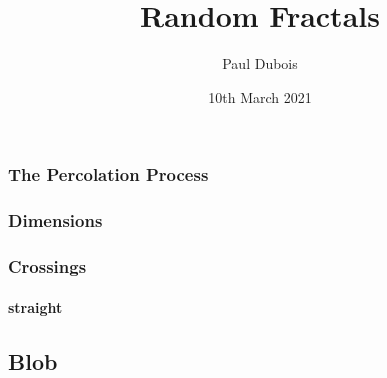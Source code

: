\documentclass{beamer}
\begin{document}
	
	\title{Random Fractals}
	\author{Paul Dubois}
	\date{10th March 2021}
	
	
	\begin{frame}[plain]
	    \titlepage
	\end{frame}
	
	\begin{frame}
	   \frametitle{The Percolation Process}
		
	\end{frame}
	
	\begin{frame}
		\frametitle{Dimensions}
	\end{frame}
	
	
	
	\begin{frame}
	   \frametitle{Crossings}
		\framesubtitle{straight}
	\end{frame}
	
	
	\begin{frame}
	    \section{Blob}
	\end{frame}
	
\end{document}
